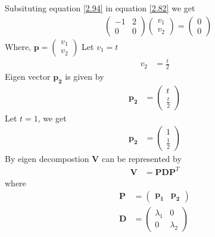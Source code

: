 \documentclass[journal,12pt,twocolumn]{IEEEtran}
\let\vec\mathbf
\numberwithin{equation}{subsection}
\newcommand{\myvec}[1]{\ensuremath{\begin{pmatrix}#1\end{pmatrix}}}
\begin{document}
Subsituting equation \ref{2.94} in equation \ref{2.82} we get
\begin{align}
        &   \myvec{-1 & 2 \\ 0& 0}\myvec{v_1 \\ v_2}=\myvec{0 \\ 0}\label{2.95}
\end{align}
Where, $\vec{p}=\myvec{v_1\\v_2}$
Let $v_1=t$
\begin{align}
    v_2&=\frac{t}{2}
\end{align}
Eigen vector $\vec{p_2}$ is given by
\begin{align}
    \vec{p_2}&=\myvec{t \\ \frac{t}{2}}
\end{align}
Let $t=1$, we get
\begin{align}
        \vec{p_2}&=\myvec{1 \\\frac{1 }{2}}\label{2.98}
\end{align}
By eigen decompostion $\vec{V}$ can be represented by
\begin{align}
    \vec{V}&=\vec{P}\vec{D}\vec{P}^T\label{2.99}
\end{align}
where 
\begin{align}
        \vec{P}&=\myvec{\vec{p_1} & \vec{p_2}}\label{2.100}\\
    \vec{D}&=\myvec{\lambda_1 & 0 \\0 & \lambda_2}\label{2.101}
\end{align}
\end{document}
